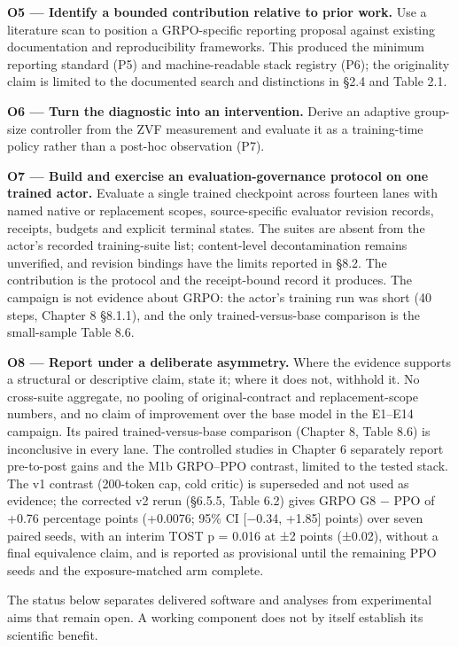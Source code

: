 \documentclass[12pt,a4paper]{report}
\begin{document}
\textbf{O5 --- Identify a bounded contribution relative to prior work.}
Use a literature scan to position a GRPO-specific reporting proposal
against existing documentation and reproducibility frameworks. This
produced the minimum reporting standard (P5) and machine-readable stack
registry (P6); the originality claim is limited to the documented search
and distinctions in §2.4 and Table 2.1.

\textbf{O6 --- Turn the diagnostic into an intervention.} Derive an
adaptive group-size controller from the ZVF measurement and evaluate it
as a training-time policy rather than a post-hoc observation (P7).

\textbf{O7 --- Build and exercise an evaluation-governance protocol on
one trained actor.} Evaluate a single trained checkpoint across fourteen
lanes with named native or replacement scopes, source-specific evaluator
revision records, receipts, budgets and explicit terminal states. The
suites are absent from the actor's recorded training-suite list;
content-level decontamination remains unverified, and revision bindings
have the limits reported in §8.2. The contribution is the protocol and
the receipt-bound record it produces. The campaign is not evidence about
GRPO: the actor's training run was short (40 steps, Chapter 8 §8.1.1),
and the only trained-versus-base comparison is the small-sample Table
8.6.

\textbf{O8 --- Report under a deliberate asymmetry.} Where the evidence
supports a structural or descriptive claim, state it; where it does not,
withhold it. No cross-suite aggregate, no pooling of original-contract
and replacement-scope numbers, and no claim of improvement over the base
model in the E1--E14 campaign. Its paired trained-versus-base comparison
(Chapter 8, Table 8.6) is inconclusive in every lane. The controlled
studies in Chapter 6 separately report pre-to-post gains and the M1b
GRPO--PPO contrast, limited to the tested stack. The v1 contrast
(200-token cap, cold critic) is superseded and not used as evidence; the
corrected v2 rerun (§6.5.5, Table 6.2) gives GRPO G8 − PPO of +0.76
percentage points (+0.0076; 95\% CI {[}−0.34, +1.85{]} points) over
seven paired seeds, with an interim TOST p = 0.016 at ±2 points (±0.02),
without a final equivalence claim, and is reported as provisional until
the remaining PPO seeds and the exposure-matched arm complete.

The status below separates delivered software and analyses from
experimental aims that remain open. A working component does not by
itself establish its scientific benefit.
\end{document}
